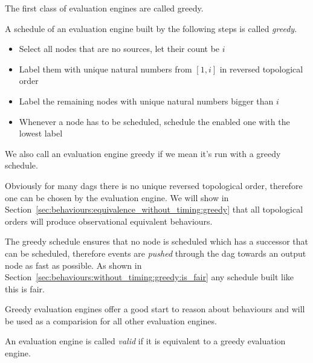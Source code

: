 The first class of evaluation engines are called greedy.

\begin{definition}\label{def:greedy_schedule}
  A schedule of an evaluation engine built by the following steps is called \emph{greedy}.
  \begin{itemize}
    \item Select all nodes that are no sources, let their count be \(i\)
    \item Label them with unique natural numbers from \([1,i]\) in reversed topological order
    \item Label the remaining nodes with unique natural numbers bigger than \(i\)
    \item Whenever a node has to be scheduled, schedule the enabled one with the lowest label
  \end{itemize}

  We also call an evaluation engine greedy if we mean it's run with a greedy schedule.
\end{definition}

Obviously for many \glspl{dag} there is no unique reversed topological order, therefore one can be chosen by the evaluation engine.
We will show in Section~\ref{sec:behaviours:equivalence_without_timing:greedy} that all topological orders will produce observational equivalent behaviours.

The greedy schedule ensures that no node is scheduled which has a successor that can be scheduled, therefore events are \emph{pushed} through the \gls{dag} towards an output node as fast as possible.
As shown in Section~\ref{sec:behaviours:without_timing:greedy:is_fair} any schedule built like this is fair.

Greedy evaluation engines offer a good start to reason about behaviours and will be used as a comparision for all other evaluation engines.

\begin{definition}[name = Valid Evaluation Engines]\label{def:valid_eval_engine}
  An evaluation engine is called \emph{valid} if it is equivalent to a greedy evaluation engine.
\end{definition}


